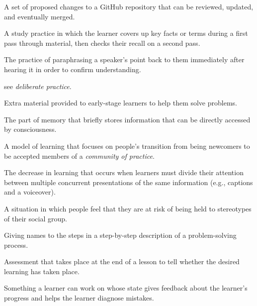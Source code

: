 \begin{description}
 A set of proposed changes to a
GitHub repository that can be reviewed, updated, and eventually
merged.



 A study practice
in which the learner covers up key facts or terms during a first pass
through material, then checks their recall on a second pass.

 The practice
of paraphrasing a speaker's point back to them immediately after
hearing it in order to confirm understanding.

 see
\emph{deliberate practice}.


Extra material provided to early-stage learners to help them solve
problems.

 The part of memory
that briefly stores information that can be directly accessed by
consciousness.

 A model of learning
that focuses on people's transition from being newcomers to be
accepted members of a \emph{community of practice}.

 The
decrease in learning that occurs when learners must divide their
attention between multiple concurrent presentations of the same
information (e.g., captions and a voiceover).

 A situation in which
people feel that they are at risk of being held to stereotypes of
their social group.

 Giving names to the
steps in a step-by-step description of a problem-solving process.

 Assessment
that takes place at the end of a lesson to tell whether the desired
learning has taken place.


Something a learner can work on whose state gives feedback about the
learner's progress and helps the learner diagnose mistakes.


\end{description}
